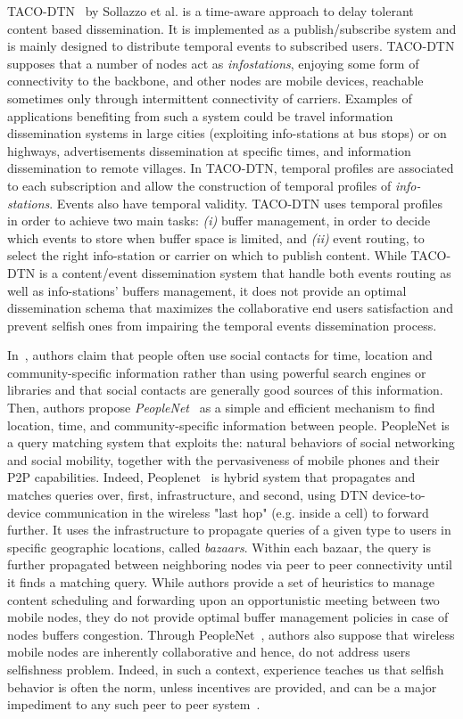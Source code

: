 TACO-DTN~\cite{TACODTN} by Sollazzo et al. is a time-aware approach to delay tolerant content based dissemination. It is implemented as a publish/subscribe system and is mainly designed to distribute temporal events to subscribed users. TACO-DTN supposes that a number of nodes act as \emph{infostations}, enjoying some form of connectivity to the backbone, and other nodes are mobile devices, reachable sometimes only through intermittent connectivity of carriers. Examples of applications benefiting from such a system could be travel information dissemination systems in  large cities (exploiting info-stations at bus stops) or on highways, advertisements dissemination at specific times, and information dissemination to remote villages. In TACO-DTN, temporal profiles are associated to each subscription and allow the construction of temporal profiles of \emph{info-stations}. Events also have temporal validity. TACO-DTN uses temporal profiles in order to achieve two main tasks: \emph{(i)} buffer management, in order to decide which events to store when buffer space is limited, and \emph{(ii)} event routing, to select the right info-station or carrier on which to publish content. While TACO-DTN is a content/event dissemination system that handle both events routing as well as info-stations' buffers management, it does not provide an optimal dissemination schema that maximizes the collaborative end users satisfaction and prevent selfish ones from impairing the temporal events dissemination process.

In~\cite{Peoplenet}, authors claim that people often use social contacts for time, location and community-specific information rather than using powerful search engines or libraries and that social contacts are generally good sources of this information. Then, authors propose  \emph{PeopleNet}~\cite{Peoplenet} as a simple and efficient mechanism to find location, time, and community-specific information between people. PeopleNet is a query matching system that exploits the: natural behaviors of social networking and social mobility, together with the pervasiveness of mobile phones and their P2P capabilities. Indeed, Peoplenet~\cite{Peoplenet} is hybrid system that propagates and matches queries over, first, infrastructure, and second, using DTN device-to-device communication in the wireless "last hop" (e.g. inside a cell) to forward further. It uses the  infrastructure to propagate queries of a given type to users in specific geographic locations, called \emph{bazaars}. Within each bazaar, the query is further propagated between neighboring nodes via peer to peer connectivity until it finds a matching query. While authors provide a set of heuristics to manage content scheduling and forwarding upon an opportunistic meeting between two mobile nodes, they do not provide optimal buffer management policies in case of nodes buffers congestion. Through PeopleNet~\cite{Peoplenet}, authors also suppose that wireless mobile nodes are inherently collaborative and hence, do not address users selfishness problem. Indeed, in such a context, experience teaches us that selfish behavior is often the norm, unless incentives are provided, and can be a major impediment to any such peer to peer system~\cite{NashEquilibria}.
  
